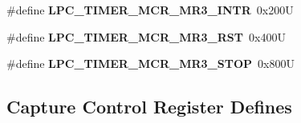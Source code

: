 \begin{DoxyCompactItemize}
\mbox{\label{group__lpc__timer_ga34f96a5b79392f3330fdbcd2758e01d5}} 
\#define {\bfseries L\+P\+C\+\_\+\+T\+I\+M\+E\+R\+\_\+\+M\+C\+R\+\_\+\+M\+R3\+\_\+\+I\+N\+TR}~0x200U
\item 
\mbox{\label{group__lpc__timer_ga3dd61236b1d128f8cd619f2dcbd459bc}} 
\#define {\bfseries L\+P\+C\+\_\+\+T\+I\+M\+E\+R\+\_\+\+M\+C\+R\+\_\+\+M\+R3\+\_\+\+R\+ST}~0x400U
\item 
\mbox{\label{group__lpc__timer_ga9e298bc7109f52a3d8498762f189f6a5}} 
\#define {\bfseries L\+P\+C\+\_\+\+T\+I\+M\+E\+R\+\_\+\+M\+C\+R\+\_\+\+M\+R3\+\_\+\+S\+T\+OP}~0x800U
\end{DoxyCompactItemize}
\subsection*{Capture Control Register Defines}
